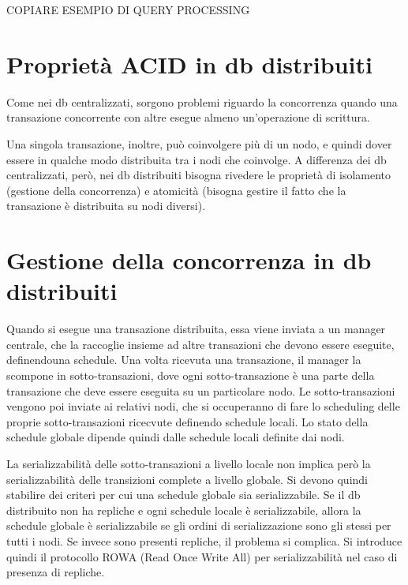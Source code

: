 COPIARE ESEMPIO DI QUERY PROCESSING

\section{Proprietà ACID in db distribuiti}
Come nei db centralizzati, sorgono problemi riguardo la concorrenza
quando una transazione concorrente con altre esegue almeno un'operazione di
scrittura.

Una singola transazione, inoltre, può coinvolgere più di un nodo, e quindi
dover essere in qualche modo distribuita tra i nodi che coinvolge.
A differenza dei db centralizzati, però, nei db distribuiti bisogna rivedere
le proprietà di isolamento (gestione della concorrenza) e atomicità (bisogna
gestire il fatto che la transazione è distribuita su nodi diversi).

\section{Gestione della concorrenza in db distribuiti}
Quando si esegue una transazione distribuita, essa viene inviata a
un manager centrale, che la raccoglie insieme ad altre transazioni che devono
essere eseguite, definendouna schedule.
Una volta ricevuta una transazione, il manager la scompone in sotto-transazioni,
dove ogni sotto-transazione è una parte della transazione che deve essere
eseguita su un particolare nodo. Le sotto-transazioni vengono poi inviate
ai relativi nodi, che si occuperanno di fare lo scheduling delle proprie
sotto-transazioni ricecvute definendo schedule locali.
Lo stato della schedule globale dipende quindi dalle schedule locali definite
dai nodi.

La serializzabilità delle sotto-transazioni a livello locale non implica però
la serializzabilità delle transizioni complete a livello globale.
Si devono quindi stabilire dei criteri per cui una schedule globale sia serializzabile.
Se il db distribuito non ha repliche e ogni schedule locale è serializzabile,
allora la schedule globale è serializzabile se gli ordini di serializzazione
sono gli stessi per tutti i nodi.
Se invece sono presenti repliche, il problema si complica.
Si introduce quindi il protocollo ROWA (Read Once Write All) per serializzabilità
nel caso di presenza di repliche.

